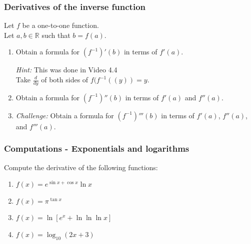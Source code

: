 \documentclass[14pt]{beamer}
\begin{document}
\begin{frame}[t]
	\frametitle{Derivatives of the inverse function}

	Let $f$ be a one-to-one function. \\ Let $a, b \in \mathbb{R}$ such that $b=f(a
	)$.

	\vfill
	\begin{enumerate}
		\item Obtain a formula for $\displaystyle \left(f^{-1}\right)'(b)$ in terms of
			$\displaystyle f'(a)$.
			\vspace{.2cm}

			{\fontsize{13}{13}\selectfont \emph{Hint:} This was done in Video 4.4 \\ Take $\displaystyle \frac{d}{dy}$ of both sides of \quad $\displaystyle f(f^{-1}( (y)) = y$. }

			\vfill

		\item Obtain a formula for $\displaystyle \left(f^{-1}\right)''(b)$ in terms
			of $\displaystyle f'(a)$ and $\displaystyle f''(a)$.

			\vfill

		\item \emph{Challenge:} Obtain a formula for
			$\displaystyle \left(f^{-1}\right)'''(b)$ in terms of
			$\displaystyle f'(a)$, $\displaystyle f''(a)$, and $\displaystyle f'''(a)$.
	\end{enumerate}
\end{frame}

\begin{frame}[t]
	\frametitle{Computations - Exponentials and logarithms}

	Compute the derivative of the following functions:

	\begin{enumerate}
		\item $\displaystyle f(x) = e^{\sin x + \cos x}\ln x$
			\vfill

		\item $\displaystyle f(x) = \pi^{\tan x}$
			\vfill

		\item $\displaystyle f(x) = \ln \left[ e^{x}+ \ln \ln \ln x \right]$
			\vfill

		\item $\displaystyle f(x) = \log_{10}\left( 2x + 3 \right)$
			\vfill
	\end{enumerate}
\end{frame}
\end{document}

